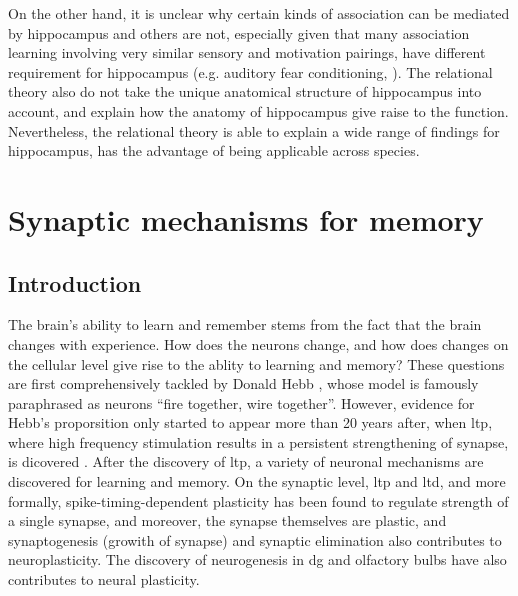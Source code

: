 On the other hand, it is unclear why certain kinds of association can be mediated by hippocampus and others are not, especially given that many association learning involving very similar sensory and motivation pairings, have different requirement for hippocampus (e.g. auditory fear conditioning, \citep{phillips92}). The relational theory also do not take the unique anatomical structure of hippocampus into account, and explain how the anatomy of hippocampus give raise to the function. Nevertheless, the relational theory is able to explain a wide range of findings for hippocampus, has the advantage of being applicable across species.

\begin{comment}
\subsubsection{Conclusion}
\citep{opitz14} hpc and memory
\citep{shohamy13} hpc in cognition
\citep{huijgen15} hpc node of memory

\citep{lee16} lesion studies review
\citep{mcdonald13} memory to behaviour
\citep{middei14} hpc in learning disorder
\citep{eichenbaum14} hpc where vs episodic
\citep{sasaki15} hpc memory circuit
\end{comment}

\section{Synaptic mechanisms for memory}
\subsection{Introduction}
The brain's ability to learn and remember stems from the fact that the brain changes with experience. How does the neurons change, and how does changes on the cellular level give rise to the ablity to learning and memory? These questions are first comprehensively tackled by Donald Hebb \citeyear{hebb49}, whose model is famously paraphrased as neurons ``fire together, wire together''. However, evidence for Hebb's proporsition only started to appear more than 20 years after, when \gls{ltp}, where high frequency stimulation results in a persistent strengthening of synapse, is dicovered \citep{bliss73}. After the discovery of \gls{ltp}, a variety of neuronal mechanisms are discovered for learning and memory. On the synaptic level, \gls{ltp} and \gls{ltd}, and more formally, spike-timing-dependent plasticity has been found to regulate strength of a single synapse, and moreover, the synapse themselves are plastic, and synaptogenesis (growith of synapse) and synaptic elimination also contributes to neuroplasticity. The discovery of neurogenesis in \gls{dg} and olfactory bulbs have also contributes to neural plasticity.


